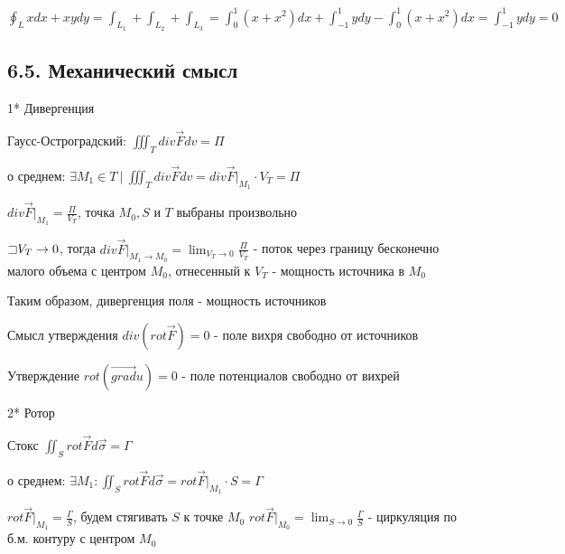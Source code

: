 \documentclass[12pt]{article}
\begin{document}
    $\oint_L xdx + xydy = \int_{L_1} + \int_{L_2} + \int_{L_3} = \int_0^1 (x + x^2) dx + \int_{-1}^1 y dy - \int_0^1 (x + x^2) dx = \int_{-1}^1 y dy = 0$

    \subsection{6.5. Механический смысл}

    \hypertarget{divergencemechanicalmeaning}{}

    1* Дивергенция

    Гаусс-Остроградский: $\iiint_T div \overrightarrow{F} dv = \Pi$

    \Ths о среднем: $\exists M_1 \in T \ | \ \iiint_T div \overrightarrow{F} dv = div \overrightarrow{F} \Big|_{M_1} \cdot V_T = \Pi$

    $div \overrightarrow{F} \Big|_{M_1} = \frac{\Pi}{V_T}$, точка $M_0, S$ и $T$ выбраны произвольно

    $\mathord{\sqsupset} V_T \to 0$, тогда $div \overrightarrow{F} \Big|_{M_1 \to M_0} = \lim_{V_T \to 0} \frac{\Pi}{V_T}$ - поток через границу бесконечно малого объема с центром $M_0$, отнесенный к $V_T$ - мощность источника в $M_0$

    Таким образом, дивергенция поля - мощность источников

    \Nota Смысл утверждения $div (rot \overrightarrow F) = 0$ - поле вихря свободно от источников

    \Nota Утверждение $rot (\overrightarrow{grad} u) = 0$ - поле потенциалов свободно от вихрей

    \mediumvspace

    \hypertarget{rotormechanicalmeaning}{}

    2* Ротор

    Стокс $\iint_S rot \overrightarrow{F} d\overrightarrow{\sigma} = \Gamma$

    \Ths о среднем: $\exists M_1 : \iint_S rot \overrightarrow{F} d\overrightarrow{\sigma} = rot \overrightarrow{F} \Big|_{M_1} \cdot S = \Gamma$

    $rot \overrightarrow{F} \Big|_{M_1} = \frac{\Gamma}{S}$, будем стягивать $S$ к точке $M_0$ \Longrightarrow $rot \overrightarrow{F} \Big|_{M_0} = \lim_{S \to 0} \frac{\Gamma}{S}$ - циркуляция по б.м. контуру с центром $M_0$
\end{document}
